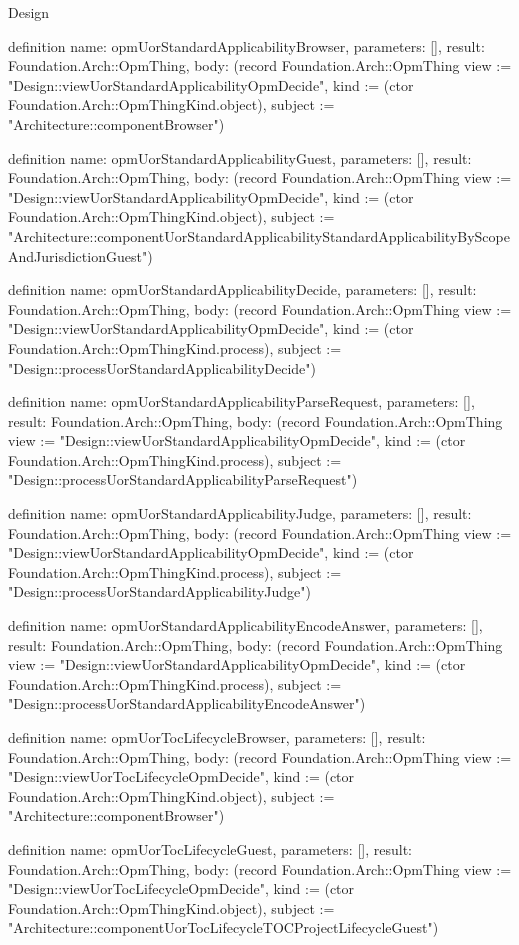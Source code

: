 \begin{lexlean}{Design}
\begin{semanticmodule}
definition{
  name: opmUorStandardApplicabilityBrowser,
  parameters: [],
  result: Foundation.Arch::OpmThing,
  body: (record Foundation.Arch::OpmThing {view := "Design::viewUorStandardApplicabilityOpmDecide", kind := (ctor Foundation.Arch::OpmThingKind.object), subject := "Architecture::componentBrowser"})
}

definition{
  name: opmUorStandardApplicabilityGuest,
  parameters: [],
  result: Foundation.Arch::OpmThing,
  body: (record Foundation.Arch::OpmThing {view := "Design::viewUorStandardApplicabilityOpmDecide", kind := (ctor Foundation.Arch::OpmThingKind.object), subject := "Architecture::componentUorStandardApplicabilityStandardApplicabilityByScopeAndJurisdictionGuest"})
}

definition{
  name: opmUorStandardApplicabilityDecide,
  parameters: [],
  result: Foundation.Arch::OpmThing,
  body: (record Foundation.Arch::OpmThing {view := "Design::viewUorStandardApplicabilityOpmDecide", kind := (ctor Foundation.Arch::OpmThingKind.process), subject := "Design::processUorStandardApplicabilityDecide"})
}

definition{
  name: opmUorStandardApplicabilityParseRequest,
  parameters: [],
  result: Foundation.Arch::OpmThing,
  body: (record Foundation.Arch::OpmThing {view := "Design::viewUorStandardApplicabilityOpmDecide", kind := (ctor Foundation.Arch::OpmThingKind.process), subject := "Design::processUorStandardApplicabilityParseRequest"})
}

definition{
  name: opmUorStandardApplicabilityJudge,
  parameters: [],
  result: Foundation.Arch::OpmThing,
  body: (record Foundation.Arch::OpmThing {view := "Design::viewUorStandardApplicabilityOpmDecide", kind := (ctor Foundation.Arch::OpmThingKind.process), subject := "Design::processUorStandardApplicabilityJudge"})
}

definition{
  name: opmUorStandardApplicabilityEncodeAnswer,
  parameters: [],
  result: Foundation.Arch::OpmThing,
  body: (record Foundation.Arch::OpmThing {view := "Design::viewUorStandardApplicabilityOpmDecide", kind := (ctor Foundation.Arch::OpmThingKind.process), subject := "Design::processUorStandardApplicabilityEncodeAnswer"})
}

definition{
  name: opmUorTocLifecycleBrowser,
  parameters: [],
  result: Foundation.Arch::OpmThing,
  body: (record Foundation.Arch::OpmThing {view := "Design::viewUorTocLifecycleOpmDecide", kind := (ctor Foundation.Arch::OpmThingKind.object), subject := "Architecture::componentBrowser"})
}

definition{
  name: opmUorTocLifecycleGuest,
  parameters: [],
  result: Foundation.Arch::OpmThing,
  body: (record Foundation.Arch::OpmThing {view := "Design::viewUorTocLifecycleOpmDecide", kind := (ctor Foundation.Arch::OpmThingKind.object), subject := "Architecture::componentUorTocLifecycleTOCProjectLifecycleGuest"})
}


\end{semanticmodule}
\end{lexlean}
